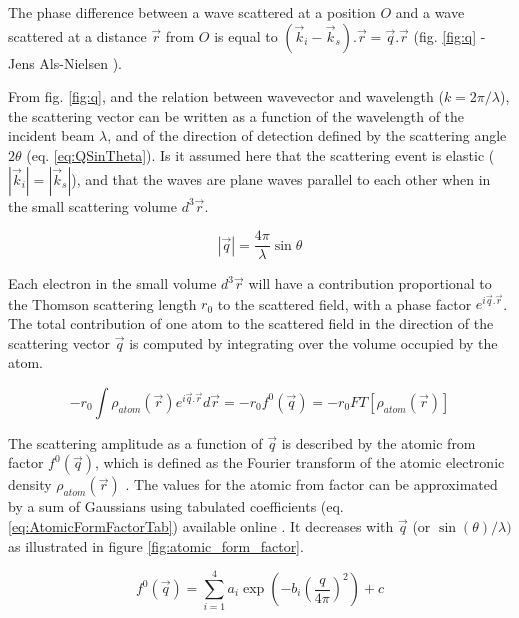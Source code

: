 The phase difference between a wave scattered at a position $O$ and a wave scattered at a distance $\vec{r}$ from $O$ is equal to $(\vec{k}_i - \vec{k}_s).\vec{r} = \vec{q}.\vec{r}$ (fig. \ref{fig:q} - Jens Als-Nielsen \cite*{NielsenMcMorrow}).

From fig. \ref{fig:q}, and the relation between wavevector and wavelength ($k = 2 \pi/\lambda$), the scattering vector can be written as a function of the wavelength of the incident beam $\lambda$, and of the direction of detection defined by the scattering angle $2\theta$ (eq. \ref{eq:QSinTheta}).
Is it assumed here that the scattering event is elastic ($|\vec{k}_i|=|\vec{k}_s|$), and that the waves are plane waves parallel to each other when in the small scattering volume $d^3\vec{r}$.

\begin{equation}
    \label{eq:QSinTheta}
    |\vec{q}| = \frac{4\pi}{\lambda} \sin{\theta}
\end{equation}

Each electron in the small volume $d^3\vec{r}$ will have a contribution proportional to the Thomson scattering length $r_0$ to the scattered field, with a phase factor $e^{i\vec{q}.\vec{r}}$.
The total contribution of one atom to the scattered field in the direction of the scattering vector $\vec{q}$ is computed by integrating over the volume occupied by the atom.

\begin{equation}
    \label{eq:AtomicFormFactor}
    -r_0 \int \rho_{atom} (\vec{r}) e^{i\vec{q}.\vec{r}} d\vec{r} = -r_0 f^0(\vec{q}) = -r_0 FT [\rho_{atom} (\vec{r})]
\end{equation}

The scattering amplitude as a function of $\vec{q}$ is described by the atomic from factor $f^0(\vec{q})$, which is defined as the Fourier transform of the atomic electronic density $\rho_{atom}(\vec{r})$ \parencite{Paganin}.
The values for the atomic from factor can be approximated by a sum of Gaussians using tabulated coefficients (eq. \ref{eq:AtomicFormFactorTab}) available online \parencite{InterTablesOfCryst}.
It decreases with $\vec{q}$ (or $\sin(\theta) / \lambda)$ as illustrated in figure \ref{fig:atomic_form_factor}.

\begin{equation}
    \label{eq:AtomicFormFactorTab}
    f^0(\vec{q}) = \sum_{i=1}^4 a_i \exp (-b_i (\frac{q} {4\pi})^2) + c
\end{equation}

